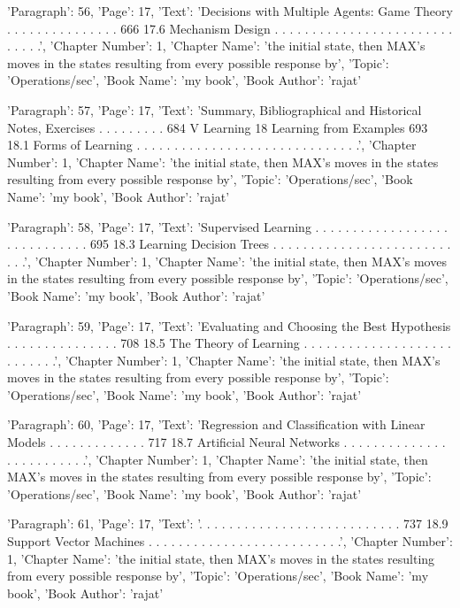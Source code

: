 {'Paragraph': 56, 'Page': 17, 'Text': 'Decisions with Multiple Agents: Game Theory . . . . . . . . . . . . . . . 666 17.6 Mechanism Design . . . . . . . . . . . . . . . . . . . . . . . . . . . . .', 'Chapter Number': 1, 'Chapter Name': 'the initial state, then MAX’s moves in the states resulting from every possible response by', 'Topic': 'Operations/sec', 'Book Name': 'my book', 'Book Author': 'rajat'}

{'Paragraph': 57, 'Page': 17, 'Text': 'Summary, Bibliographical and Historical Notes, Exercises . . . . . . . . . 684 V Learning 18 Learning from Examples 693 18.1 Forms of Learning . . . . . . . . . . . . . . . . . . . . . . . . . . . . . .', 'Chapter Number': 1, 'Chapter Name': 'the initial state, then MAX’s moves in the states resulting from every possible response by', 'Topic': 'Operations/sec', 'Book Name': 'my book', 'Book Author': 'rajat'}

{'Paragraph': 58, 'Page': 17, 'Text': 'Supervised Learning . . . . . . . . . . . . . . . . . . . . . . . . . . . . . 695 18.3 Learning Decision Trees . . . . . . . . . . . . . . . . . . . . . . . . . . .', 'Chapter Number': 1, 'Chapter Name': 'the initial state, then MAX’s moves in the states resulting from every possible response by', 'Topic': 'Operations/sec', 'Book Name': 'my book', 'Book Author': 'rajat'}

{'Paragraph': 59, 'Page': 17, 'Text': 'Evaluating and Choosing the Best Hypothesis . . . . . . . . . . . . . . . 708 18.5 The Theory of Learning . . . . . . . . . . . . . . . . . . . . . . . . . . .', 'Chapter Number': 1, 'Chapter Name': 'the initial state, then MAX’s moves in the states resulting from every possible response by', 'Topic': 'Operations/sec', 'Book Name': 'my book', 'Book Author': 'rajat'}

{'Paragraph': 60, 'Page': 17, 'Text': 'Regression and Classiﬁcation with Linear Models . . . . . . . . . . . . . 717 18.7 Artiﬁcial Neural Networks . . . . . . . . . . . . . . . . . . . . . . . . .', 'Chapter Number': 1, 'Chapter Name': 'the initial state, then MAX’s moves in the states resulting from every possible response by', 'Topic': 'Operations/sec', 'Book Name': 'my book', 'Book Author': 'rajat'}

{'Paragraph': 61, 'Page': 17, 'Text': '. . . . . . . . . . . . . . . . . . . . . . . . . . . 737 18.9 Support Vector Machines . . . . . . . . . . . . . . . . . . . . . . . . . .', 'Chapter Number': 1, 'Chapter Name': 'the initial state, then MAX’s moves in the states resulting from every possible response by', 'Topic': 'Operations/sec', 'Book Name': 'my book', 'Book Author': 'rajat'}

